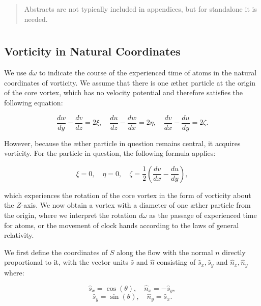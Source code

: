 \documentclass[12pt]{article}
\begin{document}
    \titlepageOpen

    \begin{abstract}
        Abstracts are not typically included in appendices, but for standalone it is needed.
    \end{abstract}

    \titlepageClose
    \fi

    \section{\appendixtitle}
\subsection{Vorticity in Natural Coordinates}


We use $d\omega$ to indicate the course of the experienced time of atoms in the natural coordinates of vorticity. We assume that there is one æther particle at the origin of the core vortex, which has no velocity potential and therefore satisfies the following equation:


\begin{equation*}
\frac{d w}{d y}-\frac{d v}{d z}=2 \xi, \quad \frac{d u}{d z}-\frac{d w}{d x}=2 \eta, \quad \frac{d v}{d x}-\frac{d u}{d y}=2 \zeta.
\end{equation*}


However, because the æther particle in question remains central, it acquires vorticity. For the particle in question, the following formula applies:


\begin{equation*}
\xi=0, \quad \eta=0, \quad \zeta=\frac{1}{2}\left(\frac{d v}{d x}-\frac{d u}{d y}\right),
\end{equation*}


which experiences the rotation of the core vortex in the form of vorticity about the $Z$-axis. We now obtain a vortex with a diameter of one æther particle from the origin, where we interpret the rotation $d\omega$ as the passage of experienced time for atoms, or the movement of clock hands according to the laws of general relativity.


We first define the coordinates of $S$ along the flow with the normal $n$ directly proportional to it, with the vector units $\hat{s}$ and $\hat{n}$ consisting of $\hat{s}_x, \hat{s}_y$ and $\hat{n}_x, \hat{n}_y$ where:


\begin{equation*}
\hat{s}_x=\cos (\theta), \quad \hat{n}_x=-\hat{s}_y,
\end{equation*}
\begin{equation*}
\hat{s}_y=\sin (\theta), \quad \hat{n}_y=\hat{s}_x.
\end{equation*}
\end{document}
